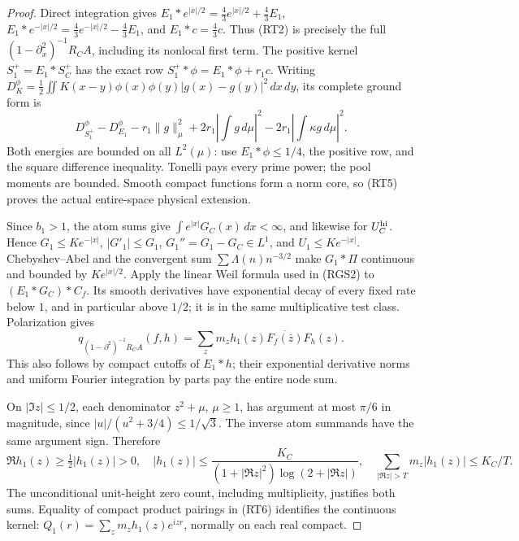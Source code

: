 \documentclass[11pt]{article}
\theoremstyle{remark}\newtheorem{remark}[theorem]{Remark}
\begin{document}
\begin{proof}
Direct integration gives
\(E_1*e^{|x|/2}=\frac43e^{|x|/2}+\frac43E_1\),
\(E_1*e^{-|x|/2}=\frac43e^{-|x|/2}-\frac43E_1\), and
\(E_1*c=\frac43c\). Thus (RT2) is precisely the full
\((1-\partial_x^2)^{-1}R_CA\), including its nonlocal first term.
The positive kernel \(S_1^+=E_1*S_C^+\) has the exact row
\(S_1^+*\phi=E_1*\phi+r_1c\).
Writing \(D_K^\phi=\frac12\iint K(x-y)\phi(x)\phi(y)
|g(x)-g(y)|^2\,dx\,dy\), its complete ground form is
\[
 D_{S_1^+}^\phi-D_{E_1}^\phi-r_1\|g\|_\mu^2
       +2r_1\left|\int g\,d\mu\right|^2
       -2r_1\left|\int\kappa g\,d\mu\right|^2 .     \tag{RT5}
\]
Both energies are bounded on all \(L^2(\mu)\): use
\(E_1*\phi\le1/4\), the positive row, and the square difference
inequality. Tonelli pays every prime power; the pool moments
are bounded. Smooth compact functions form a norm core, so
(RT5) proves the actual entire-space physical extension.

Since \(b_1>1\), the atom sums give
\(\int e^{|x|}G_C(x)\,dx<\infty\), and likewise for
\(U_C^{\rm hi}\). Hence
\(G_1\le Ke^{-|x|}\), \(|G'_1|\le G_1\),
\(G_1''=G_1-G_C\in L^1\), and \(U_1\le Ke^{-|x|}\).
Chebyshev--Abel and the convergent sum
\(\sum\Lambda(n)n^{-3/2}\) make \(G_1*\Pi\) continuous and
bounded by \(Ke^{|x|/2}\).
Apply the linear Weil formula used in (RGS2) to
\((E_1*G_C)*C_f\). Its smooth derivatives have exponential
decay of every fixed rate below \(1\), and in particular above
\(1/2\); it is in the same multiplicative test class.
Polarization gives
\[
 q_{(1-\partial^2)^{-1}R_CA}(f,h)
 =\sum_zm_z h_1(z)\overline{F_f(\bar z)}F_h(z).       \tag{RT6}
\]
This also follows by compact cutoffs of \(E_1*h\);
their exponential derivative norms and uniform Fourier
integration by parts pay the entire node sum.

On \(|\Im z|\le1/2\), each denominator \(z^2+\mu\), \(\mu\ge1\),
has argument at most \(\pi/6\) in magnitude, since
\(|u|/(u^2+3/4)\le1/\sqrt3\).
The inverse atom summands have the same argument sign. Therefore
\[
 \Re h_1(z)\ge\tfrac12|h_1(z)|>0,\quad
 |h_1(z)|\le\frac{K_C}{(1+|\Re z|^2)\log(2+|\Re z|)},\quad
 \sum_{|\Re z|>T}m_z|h_1(z)|\le K_C/T.             \tag{RT7}
\]
The unconditional unit-height zero count, including multiplicity,
justifies both sums. Equality of compact product pairings in
(RT6) identifies the continuous kernel:
\(Q_1(r)=\sum_zm_z h_1(z)e^{izr}\), normally on each real compact.


\end{proof}
\end{document}

